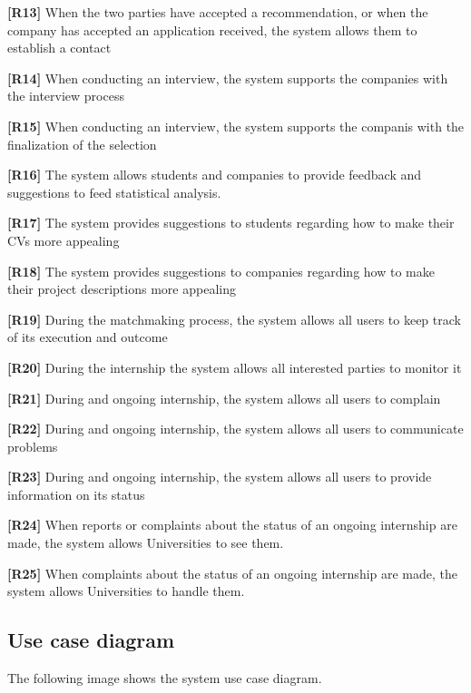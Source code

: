 \textbf{[R13]}  When the two parties have accepted a recommendation, or when the company has accepted an application received, the system allows them to establish a contact

\textbf{[R14]} When conducting an interview, the system supports the companies with the interview process

\textbf{[R15]} When conducting an interview, the system supports the companis with the finalization of the selection

\textbf{[R16]} The system allows students and companies to provide feedback and suggestions to feed statistical analysis.

\textbf{[R17] }The system provides suggestions to students regarding how to make their CVs more appealing

\textbf{[R18]} The system provides suggestions to companies regarding how to make their project descriptions more appealing

\textbf{[R19]} During the matchmaking process, the system allows all users to keep track of its execution and outcome

\textbf{[R20]} During the internship the system allows all interested parties to monitor it

\textbf{[R21]} During and ongoing internship, the system allows all users to complain 

\textbf{[R22]} During and ongoing internship, the system allows all users to communicate problems 

\textbf{[R23]} During and ongoing internship, the system allows all users to provide information on its status

\textbf{[R24]} When reports or complaints about the status of an ongoing internship are made, the system allows Universities to see them.

\textbf{[R25]} When complaints about the status of an ongoing internship are made, the system allows Universities to handle them.

\pagebreak

\subsection{Use case diagram}

The following image shows the system use case diagram.

